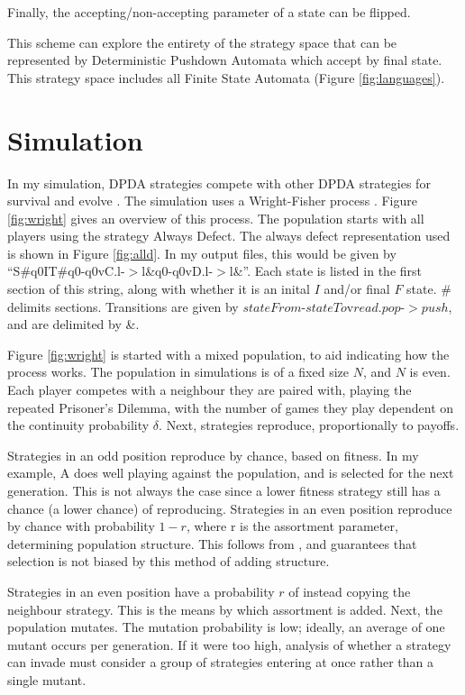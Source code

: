\documentclass[a4paper,11pt,bcshonoursthesis,singlespace,oneside,thesisdraft,pdflatex]{cssethesis}
\begin{document}
Finally, the accepting/non-accepting parameter of a state can be flipped.

This scheme can explore the entirety of the strategy space that can be represented by Deterministic Pushdown Automata which accept by final state. 
This strategy space includes all Finite State Automata (Figure \ref{fig:languages}).
\section{Simulation}
In my simulation, DPDA strategies compete with other DPDA strategies for survival and evolve \citep{fogel2006evolutionary}. 
The simulation uses a Wright-Fisher process \citep[][ch. 3.2]{hartl1997principles}. Figure \ref{fig:wright} gives an overview of this process. 
The population starts with all players using the strategy Always Defect. The always defect representation used is shown in Figure \ref{fig:alld}. In my output files, this would be given by ``S\#q0IT\#q0-q0vC.l-$>$l\&q0-q0vD.l-$>$l\&''. 
Each state is listed in the first section of this string, along with whether it is an inital $I$ and/or final $F$ state. $\#$ delimits sections. Transitions are given by {$stateFrom$-$stateTo$v$read$.$pop$-$>push$}, and are delimited by \&. 

Figure \ref{fig:wright} is started with a mixed population, to aid indicating how the process works. 
The population in simulations is of a fixed size $N$, and $N$ is even. 
Each player competes with a neighbour they are paired with, playing the repeated Prisoner's Dilemma, with the number of games they play dependent on the continuity probability $\delta$. 
Next, strategies reproduce, proportionally to payoffs. 

Strategies in an odd position reproduce by chance, based on fitness. 
In my example, A does well playing against the population, and is selected for the next generation. 
This is not always the case since a lower fitness strategy still has a chance (a lower chance) of reproducing. 
Strategies in an even position reproduce by chance with probability $1-r$, where r is the assortment parameter, determining population structure.  This follows from \citet{van-veelen:PNAS:2012}, and guarantees that selection is not biased by this method of adding structure. 

Strategies in an even position have a probability $r$ of instead copying the neighbour strategy. 
This is the means by which assortment is added. 
Next, the population mutates. 
The mutation probability is low; ideally, an average of one mutant occurs per generation. 
If it were too high, analysis of whether a strategy can invade must consider a group of strategies entering at once rather than a single mutant. 
\end{document}
